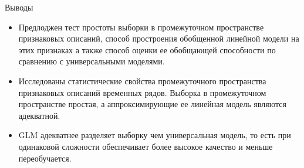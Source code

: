 \documentclass{beamer}
\DeclareMathOperator*{\argmin}{arg\,min}
\begin{document}
\begin{frame}{Выводы}
    \begin{itemize}
        \item Предлоджен тест простоты выборки в промежуточном пространстве признаковых
        описаний, способ простроения обобщенной линейной модели на этих признаках
        а также способ оценки ее обобщающей способности по сравнению с универсальными моделями.
        \item Исследованы статистические свойства промежуточного пространства
        признаковых описаний временных рядов. Выборка в промежуточном пространстве простая,
        а аппроксимирующие ее линейная модель являются адекватной.
        \item GLM адекватнее разделяет выборку чем универсальная модель, то есть
        при одинаковой сложности обеспечивает более высокое качество и меньше переобучается.
    \end{itemize}
\end{frame}



\end{document}
